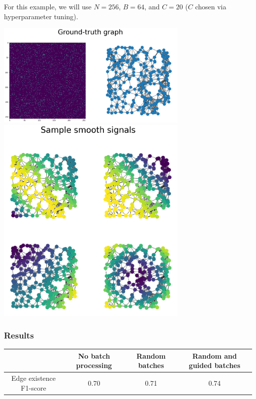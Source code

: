 \documentclass[a4paper]{article}
\newcommand{\nl}{\vspace{0.2cm}\\}
\begin{document}
For this example, we will use $N = 256$, $B = 64$, and $C = 20$ ($C$ chosen via hyperparameter tuning).\nl

\begin{center}
    \includegraphics[width=0.7\textwidth]{images/p3/ground_truth_graph.png}\nl
    \includegraphics[width=0.7\textwidth]{images/p3/sample_smooth_signals.png}
\end{center}

\subsubsection{Results}

\begin{center}
    \begin{tabular}{|c|c|c|c|}
        \hline
            & No batch processing & Random batches & Random and guided batches\\
        \hline
        Edge existence F1-score & 0.70 & 0.71 & 0.74 \\
        \hline
    \end{tabular}
\end{center}
\end{document}
